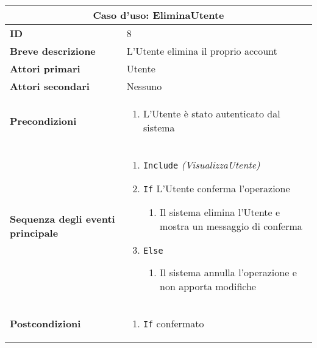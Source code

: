 \documentclass[a4paper]{report}
\begin{document}
\clearpage
\begin{table}[H]
\vspace*{-0cm}
\renewcommand{\arraystretch}{1.9}
\begin{tabular}{|p{3.9cm}|p{9.9cm}|}
\hline
\multicolumn{2}{|c|}{\textbf{Caso d’uso: EliminaUtente}} \\ \hline
\textbf{ID} & 8 \\ \hline
\textbf{Breve descrizione} &  L’Utente elimina il proprio account \\ \hline
\textbf{Attori primari} & Utente \\ \hline
\textbf{Attori secondari} & Nessuno \\ \hline
\textbf{Precondizioni} & \begin{enumerate}[leftmargin=14pt,label=\arabic*.,labelsep=0.5em,topsep=0pt,partopsep=0pt,parsep=0pt,itemsep=0pt]
    \item L’Utente è stato autenticato dal sistema
\end{enumerate} \\ \hline
\textbf{Sequenza degli eventi principale} &
\begin{enumerate}[leftmargin=14pt,label=\arabic*.,labelsep=0.5em,topsep=0pt,partopsep=0pt,parsep=0pt,itemsep=0pt]
    \item \texttt{Include} \textit{(VisualizzaUtente)} 
    \item \texttt{If} L’Utente conferma l’operazione
    \begin{enumerate}[label=\arabic{enumi}.\arabic*.,leftmargin=22pt,labelsep=0.5em,topsep=0pt,partopsep=0pt,parsep=0pt,itemsep=0pt]
        \item Il sistema elimina l’Utente e mostra un messaggio di conferma
    \end{enumerate}
    \item \texttt{Else}
    \begin{enumerate}[label=\arabic{enumi}.\arabic*.,leftmargin=22pt,labelsep=0.5em,topsep=0pt,partopsep=0pt,parsep=0pt,itemsep=0pt]
        \item Il sistema annulla l’operazione e non apporta modifiche
    \end{enumerate}
\end{enumerate}\\ \hline
\textbf{Postcondizioni} & \begin{enumerate}[leftmargin=14pt,label=\arabic*.,labelsep=0.5em,topsep=0pt,partopsep=0pt,parsep=0pt,itemsep=0pt]
    \item \texttt{If} confermato
    \begin{enumerate}[label=\arabic{enumi}.\arabic*.,leftmargin=22pt,labelsep=0.5em,topsep=0pt,partopsep=0pt,parsep=0pt,itemsep=0pt]

\end{enumerate}
\end{enumerate}
\end{tabular}
\end{table}
\end{document}
